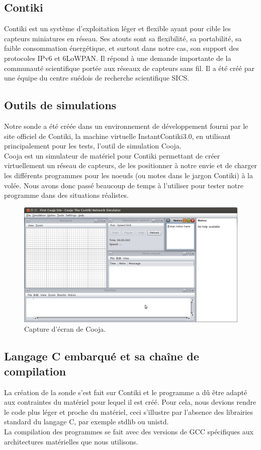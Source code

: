 	\subsection{Contiki}
	Contiki est un système d'exploitation léger et flexible ayant pour cible les capteurs miniatures en réseau. Ses atouts sont sa flexibilité, sa portabilité, sa faible consommation énergétique, et surtout dans notre cas, son support des protocoles IPv6 et 6LoWPAN. Il répond à une demande importante de la communauté scientifique portée aux réseaux de capteurs sans fil. Il a été créé par une équipe du centre suédois de recherche scientifique SICS.
	
	\subsection{Outils de simulations}
	Notre sonde a été créée dans un environnement de développement fourni par le site officiel de Contiki, la machine virtuelle InstantContiki3.0, en utilisant principalement pour les tests, l'outil de simulation Cooja.\\
	Cooja est un simulateur de matériel pour Contiki permettant de créer virtuellement un réseau de capteurs, de les positionner à notre envie et de charger les différents programmes pour les noeuds (ou motes dans le jargon Contiki) à la volée.
	Nous avons donc passé beaucoup de temps à l'utiliser pour tester notre programme dans des situations réalistes.
	\clearpage
	\begin{figure}[htp]
		\centering
		\includegraphics[width=16cm]{images/cooja}
		\caption{Capture d'écran de Cooja.}
		\label{fig:Cooja}
	\end{figure}

	\subsection{Langage C embarqué et sa chaîne de compilation}
	La création de la sonde s'est fait sur Contiki et le programme a dû être adapté aux contraintes du matériel pour lequel il est créé. Pour cela, nous devions rendre le code plus léger et proche du matériel, ceci s'illustre par l'absence des librairies standard du langage C, par exemple stdlib ou unistd.\\
	La compilation des programmes se fait avec des versions de GCC spécifiques aux architectures matérielles que nous utilisons.
	
